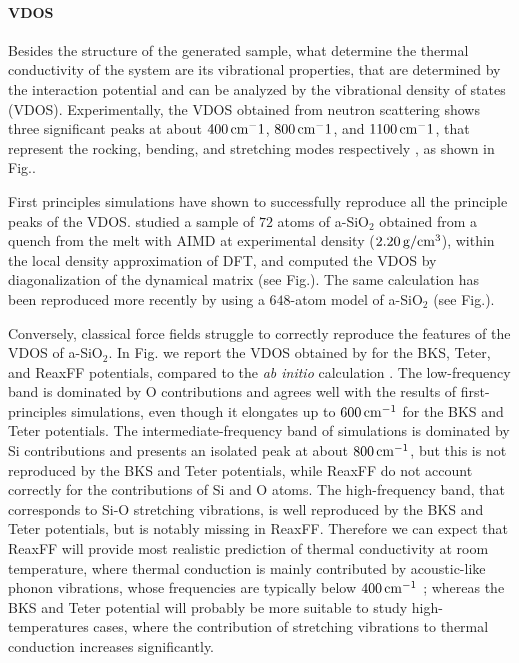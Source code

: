 \paragraph{VDOS}
Besides the structure of the generated sample, what determine the thermal conductivity of the system are its vibrational properties, that are determined by the interaction potential and can be analyzed by the vibrational density of states (VDOS).
Experimentally, the VDOS obtained from neutron scattering shows three significant peaks at about $400\,\mathrm{cm^-1}$, $800\,\mathrm{cm^-1}$, and $1100\,\mathrm{cm^-1}$, that represent the rocking, bending, and stretching modes respectively \cite{Galeener1983}, as shown in Fig..

First principles simulations have shown to successfully reproduce all the principle peaks of the VDOS. \citet{Sarnthein1997} studied a sample of $72$ atoms of a-SiO$_2$ obtained from a quench from the melt with AIMD at experimental density ($2.20\,\mathrm{g/cm^3}$), within the local density approximation of DFT, and computed the VDOS by diagonalization of the dynamical matrix (see Fig.). The same calculation has been reproduced more recently by \citet{Bhattarai2016} using a $648$-atom model of a-SiO$_2$ (see Fig.).

Conversely, classical force fields struggle to correctly reproduce the features of the VDOS of a-SiO$_2$. In Fig. we report the VDOS obtained by \citet{Tian2017} for the BKS, Teter, and ReaxFF potentials, compared to the \emph{ab initio} calculation \cite{Bhattarai2016}. The low-frequency band is dominated by O contributions and agrees well with the results of first-principles simulations, even though it elongates up to $600\,\mathrm{cm^{-1}}$ for the BKS and Teter potentials. 
The intermediate-frequency band of \abinitio simulations is dominated by Si contributions and presents an isolated peak at about $800\,\mathrm{cm^{-1}}$, but this is not reproduced by the BKS and Teter potentials, while ReaxFF do not account correctly for the contributions of Si and O atoms. 
The high-frequency band, that corresponds to Si-O stretching vibrations, is well reproduced by the BKS and Teter potentials, but is notably missing in ReaxFF. 
Therefore we can expect that ReaxFF will provide most realistic prediction of thermal conductivity at room temperature, where thermal conduction is mainly contributed by acoustic-like phonon vibrations, whose frequencies are typically below $400\,\mathrm{cm^{-1}}$ \cite{Bhattarai2016}; whereas the BKS and Teter potential will probably be more suitable to study high-temperatures cases, where the contribution of stretching vibrations to thermal conduction increases significantly. 



